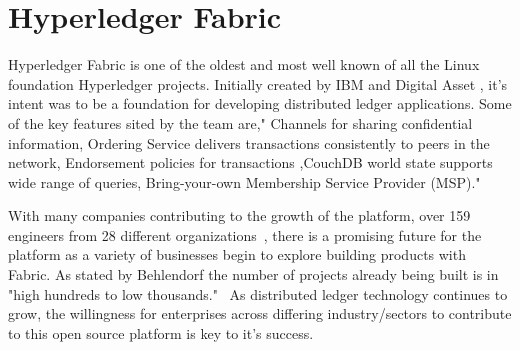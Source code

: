 \section{Hyperledger Fabric}

Hyperledger Fabric is one of the oldest and most well known of all the 
Linux foundation Hyperledger projects. Initially created by IBM and Digital 
Asset , it’s intent was to be a foundation for developing distributed ledger 
applications. Some of the key features sited by the team are," Channels for 
sharing confidential information, Ordering Service delivers transactions 
consistently to peers in the network, Endorsement policies for transactions
,CouchDB world state supports wide range of queries, Bring-your-own Membership 
Service Provider (MSP)."\cite{Hyperledger Fabric}

With many companies contributing to the growth of the platform, over 159 engineers
from 28 different organizations~\cite{Behlendorf Interview}, there is a promising
future for the platform as a variety of businesses begin to explore building products
with Fabric. As stated by Behlendorf the number of projects already being built is in
"high hundreds to low thousands."~\cite{Behlendorf Interview} As distributed ledger
technology continues to grow, the willingness for enterprises across differing
industry/sectors to contribute to this open source platform is key to it's 
success.

